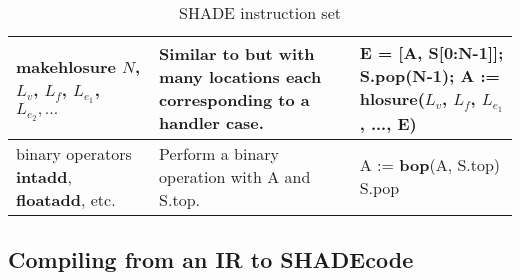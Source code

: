 \documentclass[class=article, crop=false]{standalone}
\begin{document}
\begin{table}
\begin{tabular}{|p{3cm}|p{7cm}|p{4.8cm}|}
    \parbox{20cm}{\textbf{makehlosure} \\ $N$, $L_v$, $L_f$, \\ $L_{e_1}$, $L_{e_2}, ...$ } & Similar to  but with many locations each corresponding to a handler case. & \parbox{20cm}{E = [A, S[0:N-1]]; \\ S.pop(N-1); \\ A := hlosure($L_v$, $L_f$, $L_{e_1}$, ..., E) } \\ \hline
    binary operators \textbf{intadd}, \textbf{floatadd}, etc. & Perform a binary operation with A and S.top. & \parbox{20cm}{A := \textbf{bop}(A, S.top)\\S.pop} \\
\end{tabular}
\caption{SHADE instruction set}
\label{tab:shade-bytecode}
\end{table}

\subsection{Compiling from an IR to SHADEcode}
\end{document}
